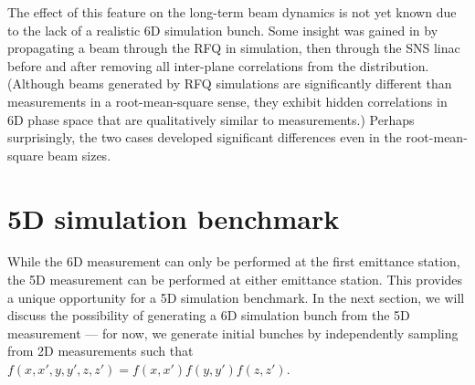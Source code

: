 \documentclass[letterpaper,
               keeplastbox,
               nospread,
               biblatex,
              ]{jacow}
\begin{document}
The effect of this feature on the long-term  beam dynamics is not yet known due to the lack of a realistic 6D simulation bunch. Some insight was gained in \cite{Ruisard2021-IPAC} by propagating a beam through the RFQ in simulation, then through the SNS linac before and after removing all inter-plane correlations from the distribution. (Although beams generated by RFQ simulations are significantly different than measurements in a root-mean-square sense, they exhibit hidden correlations in 6D phase space that are qualitatively similar to measurements.) Perhaps surprisingly, the two cases developed significant differences even in the root-mean-square beam sizes. 



\section{5D simulation benchmark}

While the 6D measurement can only be performed at the first emittance station, the 5D measurement can be performed at either emittance station. This provides a unique opportunity for a 5D simulation benchmark. In the next section, we will discuss the possibility of generating a 6D simulation bunch from the 5D measurement — for now, we generate initial bunches by independently sampling from 2D measurements such that $f(x,x',y,y',z,z') = f(x,x')f(y,y')f(z,z')$. 
\end{document}
